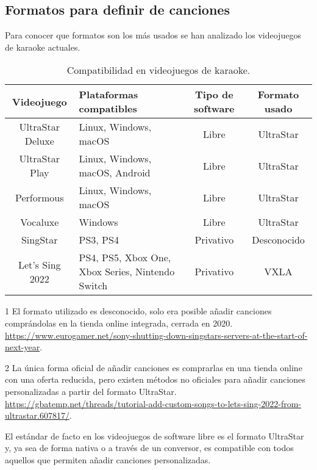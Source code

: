 \subsection{Formatos para definir de canciones}

Para conocer que formatos son los más usados se han analizado los videojuegos de karaoke actuales.

\begin{table}[h!]
	\begin{threeparttable}
		\caption{Compatibilidad en videojuegos de karaoke.}
		\begin{tabular}{ |c|>{\centering\arraybackslash}m{}|c|c|}
			\hline
			\textbf{Videojuego} & \textbf{Plataformas compatibles} & \textbf{Tipo de software} & \textbf{Formato usado} \\
			\hline
			UltraStar Deluxe & Linux, Windows, macOS & Libre & UltraStar \\
			UltraStar Play & Linux, Windows, macOS, Android & Libre & UltraStar \\
			Performous & Linux, Windows, macOS & Libre & UltraStar \\
			Vocaluxe & Windows & Libre & UltraStar \\
			SingStar & PS3, PS4 & Privativo & Desconocido\tnote{1} \\
			Let's Sing 2022 & PS4, PS5, Xbox One, Xbox Series, Nintendo Switch & Privativo & VXLA\tnote{2} \\
			\hline
		\end{tabular}
		\begin{tablenotes}
			\item [1] El formato utilizado es desconocido, solo era posible añadir canciones comprándolas en la tienda online integrada, cerrada en 2020. \url{https://www.eurogamer.net/sony-shutting-down-singstars-servers-at-the-start-of-next-year}.
			\item [2] La única forma oficial de añadir canciones es comprarlas en una tienda online con una oferta reducida, pero existen métodos no oficiales para añadir canciones personalizadas a partir del formato UltraStar.  \url{https://gbatemp.net/threads/tutorial-add-custom-songs-to-lets-sing-2022-from-ultrastar.607817/}.
		\end{tablenotes}
	\end{threeparttable}
\end{table}

El estándar de facto en los videojuegos de software libre es el formato UltraStar y, ya sea de forma nativa o a través de un conversor, es compatible con todos aquellos que permiten añadir canciones personalizadas.



